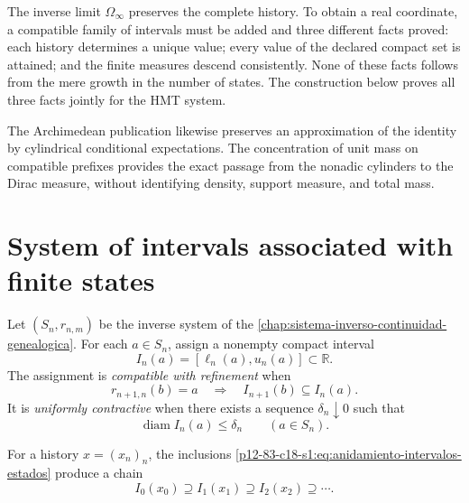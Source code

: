 \label{chap:83-18}

The inverse limit \(\Omega_\infty\) preserves the complete history. To
obtain a real coordinate, a compatible family of intervals must be
added and three different facts proved: each history determines a
unique value; every value of the declared compact set is attained; and the finite
measures descend consistently. None of these facts follows
from the mere growth in the number of states. The construction below
proves all three facts jointly for the HMT system.

The Archimedean publication likewise preserves an approximation of the
identity by cylindrical conditional expectations. The concentration of unit
mass on compatible prefixes provides the exact passage from the
nonadic cylinders to the Dirac measure, without identifying density,
support measure, and total mass.

\begin{HMTScientificOwnerSubordinated}

\end{HMTScientificOwnerSubordinated}

\section{System of intervals associated with finite states}

Let \((S_n,r_{n,m})\) be the inverse system of the
\cref{chap:sistema-inverso-continuidad-genealogica}. For each
\(a\in S_n\), assign a nonempty compact interval
\begin{equation}
 I_n(a)=[\ell_n(a),u_n(a)]\subset\mathbb R.
 \label{p12-83-c18-s1:eq:intervalo-asociado-estado}
\end{equation}
The assignment is \emph{compatible with refinement} when
\begin{equation}
 r_{n+1,n}(b)=a
 \quad\Longrightarrow\quad
 I_{n+1}(b)\subseteq I_n(a).
 \label{p12-83-c18-s1:eq:anidamiento-intervalos-estados}
\end{equation}
It is \emph{uniformly contractive} when there exists a sequence
\(\delta_n\downarrow0\) such that
\begin{equation}
 \operatorname{diam}I_n(a)\leq\delta_n
 \qquad(a\in S_n).
 \label{p12-83-c18-s1:eq:contraccion-uniforme-intervalos}
\end{equation}

For a history \(x=(x_n)_n\), the inclusions
\eqref{p12-83-c18-s1:eq:anidamiento-intervalos-estados} produce a chain
\begin{equation}
 I_0(x_0)\supseteq I_1(x_1)\supseteq I_2(x_2)\supseteq\cdots.
 \label{p12-83-c18-s1:eq:cadena-intervalos-historia}
\end{equation}

